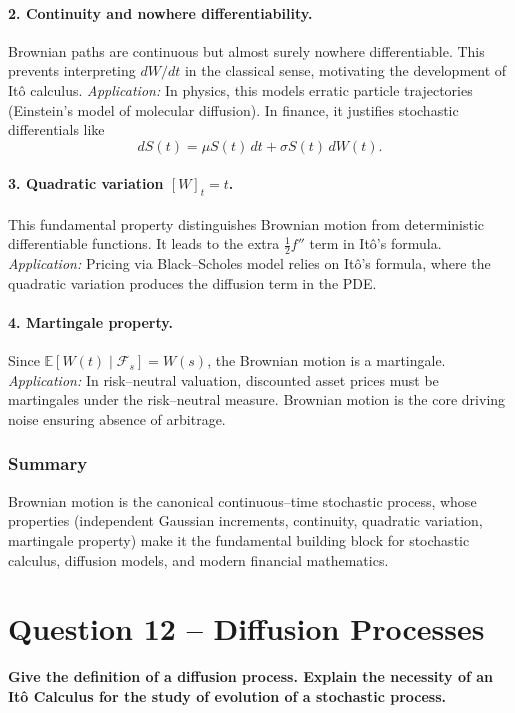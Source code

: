 \documentclass[12pt,a4paper]{book}
\theoremstyle{remark}
\newcommand{\EE}{\mathbb{E}}          %
\newcommand{\F}{\mathcal{F}}          %
\begin{document}
\paragraph{2. Continuity and nowhere differentiability.}
Brownian paths are continuous but almost surely nowhere differentiable. This prevents interpreting $dW/dt$ in the classical sense, motivating the development of Itô calculus.  
\emph{Application:} In physics, this models erratic particle trajectories (Einstein’s model of molecular diffusion). In finance, it justifies stochastic differentials like
\[
dS(t) = \mu S(t)\,dt + \sigma S(t)\,dW(t).
\]

\paragraph{3. Quadratic variation $[W]_t = t$.}
This fundamental property distinguishes Brownian motion from deterministic differentiable functions. It leads to the extra $\tfrac{1}{2}f''$ term in Itô’s formula.  
\emph{Application:} Pricing via Black–Scholes model relies on Itô’s formula, where the quadratic variation produces the diffusion term in the PDE.

\paragraph{4. Martingale property.}
Since $\EE[W(t)\mid\F_s]=W(s)$, the Brownian motion is a martingale.  
\emph{Application:} In risk–neutral valuation, discounted asset prices must be martingales under the risk–neutral measure. Brownian motion is the core driving noise ensuring absence of arbitrage.

\subsubsection*{Summary}
Brownian motion is the canonical continuous–time stochastic process, whose properties (independent Gaussian increments, continuity, quadratic variation, martingale property) make it the fundamental building block for stochastic calculus, diffusion models, and modern financial mathematics.




\newpage
\section{Question 12 -- Diffusion Processes}
\textbf{Give the definition of a diffusion process. Explain the necessity of an Itô Calculus for the study of evolution of a stochastic process.}
\end{document}

